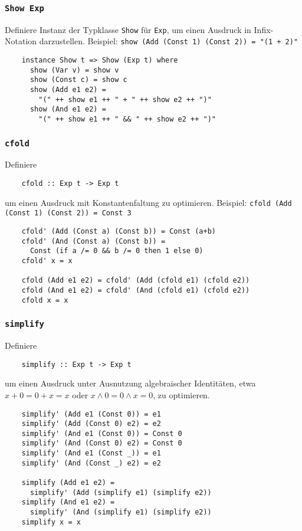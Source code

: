 \documentclass{beamer}
\begin{document}
\begin{frame}[fragile]
  \frametitle{\lstinline{Show Exp}}
  Definiere Instanz der Typklasse \lstinline{Show} für \lstinline{Exp},
  um einen Ausdruck in Infix-Notation darzustellen.
  Beispiel: \lstinline{show (Add (Const 1) (Const 2)) = "(1 + 2)"}
  \pause
  \begin{lstlisting}
    instance Show t => Show (Exp t) where
      show (Var v) = show v
      show (Const c) = show c
      show (Add e1 e2) =
        "(" ++ show e1 ++ " + " ++ show e2 ++ ")"
      show (And e1 e2) =
        "(" ++ show e1 ++ " && " ++ show e2 ++ ")"
  \end{lstlisting}
\end{frame}

\begin{frame}[fragile]
  \frametitle{\lstinline{cfold}}
  Definiere
  \begin{lstlisting}
    cfold :: Exp t -> Exp t
  \end{lstlisting}
  um einen Ausdruck mit Konstantenfaltung zu optimieren.
  Beispiel: \lstinline{cfold (Add (Const 1) (Const 2)) = Const 3}
  \pause
  \begin{lstlisting}
    cfold' (Add (Const a) (Const b)) = Const (a+b)
    cfold' (And (Const a) (Const b)) =
      Const (if a /= 0 && b /= 0 then 1 else 0)
    cfold' x = x
    
    cfold (Add e1 e2) = cfold' (Add (cfold e1) (cfold e2))
    cfold (And e1 e2) = cfold' (And (cfold e1) (cfold e2))
    cfold x = x
  \end{lstlisting}
\end{frame}

\begin{frame}[fragile]
  \frametitle{\lstinline{simplify}}
  Definiere
  \begin{lstlisting}
    simplify :: Exp t -> Exp t
  \end{lstlisting}
  um einen Ausdruck unter Ausnutzung algebraischer Identitäten,
  etwa $x+0=0+x=x$ oder $x∧0=0∧x=0$,
  zu optimieren.
  \pause
  \begin{lstlisting}
    simplify' (Add e1 (Const 0)) = e1
    simplify' (Add (Const 0) e2) = e2
    simplify' (And e1 (Const 0)) = Const 0
    simplify' (And (Const 0) e2) = Const 0
    simplify' (And e1 (Const _)) = e1
    simplify' (And (Const _) e2) = e2
    
    simplify (Add e1 e2) =
      simplify' (Add (simplify e1) (simplify e2))
    simplify (And e1 e2) =
      simplify' (And (simplify e1) (simplify e2))
    simplify x = x
  \end{lstlisting}
\end{frame}
\end{document}
